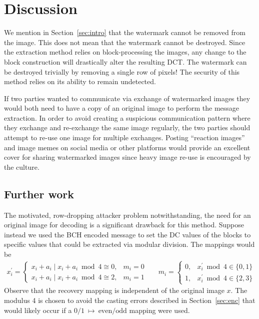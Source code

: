 \section{Discussion}\label{sec:discussion}
We mention in Section~\ref{sec:intro} that the watermark cannot be removed from the image.
This does not mean that the watermark cannot be destroyed.
Since the extraction method relies on block-processing the images, any change to the block construction will drastically alter the resulting DCT.
The watermark can be destroyed trivially by removing a single row of pixels!
The security of this method relies on its ability to remain undetected.

If two parties wanted to communicate via exchange of watermarked images they would both need to have a copy of an original image to perform the message extraction.
In order to avoid creating a suspicious communication pattern where they exchange and re-exchange the same image regularly, the two parties should attempt to re-use one image for multiple exchanges.
Posting ``reaction images'' and image memes on social media or other platforms would provide an excellent cover for sharing watermarked images since heavy image re-use is encouraged by the culture.

\subsection{Further work}
The motivated, row-dropping attacker problem notwithstanding, the need for an original image for decoding is a significant drawback for this method.
Suppose instead we used the BCH encoded message to set the DC values of the blocks to specific values that could be extracted via modular division.
The mappings would be
\begin{align*}
x^{\prime}_i = \begin{cases}
x_i + a_i \mid x_i + a_i \bmod 4 \cong 0, & m_i = 0 \\
x_i + a_i \mid x_i + a_i \bmod 4 \cong 2, & m_i = 1
\end{cases}
&&
m_i = \begin{cases}
0, & x^{\prime}_i \bmod 4 \in \{0, 1\} \\
1, & x^{\prime}_i \bmod 4 \in \{2, 3\}
\end{cases}
\end{align*}
Observe that the recovery mapping is independent of the original image $x$.
The modulus 4 is chosen to avoid the casting errors described in Section~\ref{sec:enc} that would likely occur if a $0/1~\mapsto~\text{even}/\text{odd}$ mapping were used.

